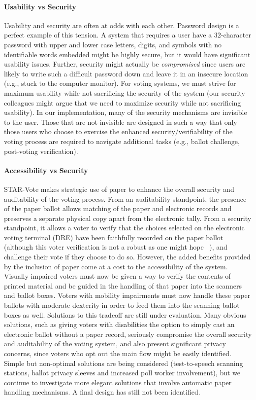 \paragraph{Usability vs Security}
Usability and security are often at odds with each other. Password
design is a perfect example of this tension. A system that requires a
user have a 32-character password with upper and lower case letters,
digits, and symbols with no identifiable words embedded might be highly
secure, but it would have significant usability issues. Further,
security might actually be \emph{compromised} since users are likely to
write such a difficult password down and leave it in an insecure
location (e.g., stuck to the computer monitor). For voting systems, we
must strive for maximum usability while not sacrificing the security of
the system (our security colleagues might argue that we need to maximize
security while not sacrificing usability). In our implementation, many
of the security mechanisms are invisible to the user. Those that are not
invisible are designed in such a way that only those users who choose to
exercise the enhanced security/verifiability of the voting process are
required to navigate additional tasks (e.g., ballot challenge,
post-voting verification). 

\paragraph{Accessibility vs Security} 
STAR-Vote makes strategic use of paper to enhance the overall security and auditability of the voting process. From an auditability standpoint, the presence of the paper ballot allows matching of the paper and electronic records and preserves a separate physical copy apart from the electronic tally. From a security standpoint, it allows a voter to verify that the choices selected on the electronic voting terminal (DRE) have been faithfully recorded on the paper ballot (although this voter verification is not a robust as one might hope ~\cite{everett-thesis}), and challenge their vote if they choose to do so. However, the added benefits provided by the inclusion of paper come at a cost to the accessibility of the system. Visually impaired voters must now be given a way to verify the contents of printed material and be guided in the handling of that paper into the scanners and ballot boxes. Voters with mobility impairments must now handle these paper ballots with moderate dexterity in order to feed them into the scanning ballot boxes as well. Solutions to this tradeoff are still under evaluation. Many obvious solutions, such as giving voters with disabilities the option to simply cast an electronic ballot without a paper record, seriously compromise the overall security and auditability of the voting system, and also present significant privacy concerns, since voters who opt out the main flow might be easily identified. Simple but non-optimal solutions are being considered (test-to-speech scanning stations, ballot privacy sleeves and increased poll worker involvement), but we continue to investigate more elegant solutions that involve automatic paper handling mechanisms. A final design has still not been identified.

